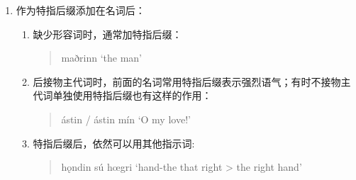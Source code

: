 \begin{enumerate}
\begin{enumerate}
        \end{enumerate}

  \item 作为特指后缀添加在名词后：
        \begin{enumerate}
          \item 缺少形容词时，通常加特指后缀：
                \begin{quote}
                  maðrinn `the man'
                \end{quote}

          \item 后接物主代词时，前面的名词常用特指后缀表示强烈语气；有时不接物主代词单独使用特指后缀也有这样的作用：
                \begin{quote}
                  ástin / ástin mín `O my love!'
                \end{quote}

          \item 特指后缀后，依然可以用其他指示词:
                \begin{quote}
                  hǫndin sú hœgri `hand-the that right \textgreater{} the right hand'
                \end{quote}

        \end{enumerate}

\end{enumerate}
